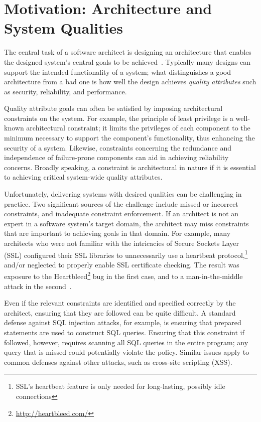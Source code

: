 \documentclass[runningheads]{llncs}
\begin{document}
\begin{sloppypar}
\section{Motivation: Architecture and System Qualities}
The central task of a software architect is designing an architecture that enables the designed system's central goals to be achieved~\cite{BCK03}.  Typically many designs can support the intended functionality of a system; what distinguishes a good architecture from a bad one is how well the design achieves \emph{quality attributes} such as security, reliability, and performance.

Quality attribute goals can often be satisfied by imposing architectural constraints on the system.  For example, the principle of least privilege is a well-known architectural constraint; it limits the privileges of each component to the minimum necessary to support the component's functionality, thus enhancing the security of a system.  Likewise, constraints concerning the redundance and independence of failure-prone components can aid in achieving reliability concerns.  Broadly speaking, a constraint is architectural in nature if it is essential to achieving critical system-wide quality attributes.

Unfortunately, delivering systems with desired qualities can be challenging in practice.  Two significant sources of the challenge include missed or incorrect constraints, and inadequate constraint enforcement.  If an architect is not an expert in a software system's target domain, the architect may miss constraints that are important to achieving goals in that domain.  For example, many architects who were not familiar with the intricacies of Secure Sockets Layer (SSL) configured their SSL libraries to unnecessarily use a heartbeat protocol,\footnote{SSL's heartbeat feature is only needed for long-lasting, possibly idle connections} and/or neglected to properly enable SSL certificate checking.  The result was exposure to the Heartbleed\footnote{\url{http://heartbleed.com/}} bug in the first case, and to a man-in-the-middle attack in the second~\cite{GIJABS12}.

Even if the relevant constraints are identified and specified correctly by the architect, ensuring that they are followed can be quite difficult.  A standard defense against SQL injection attacks, for example, is ensuring that prepared statements are used to construct SQL queries.  Ensuring that this constraint if followed, however, requires scanning all SQL queries in the entire program; any query that is missed could potentially violate the policy.  Similar issues apply to common defenses against other attacks, such as cross-site scripting (XSS).


\end{sloppypar}
\end{document}
